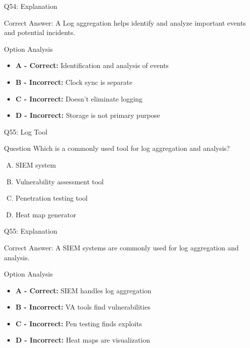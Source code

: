 \documentclass{beamer}
\begin{document}
	\begin{frame}{Q54: Explanation}
		\begin{block}{Correct Answer: A}
			Log aggregation helps identify and analyze important events and potential incidents.
		\end{block}
		\begin{block}{Option Analysis}
			\begin{itemize}
				\item \textbf{A - Correct:} Identification and analysis of events
				\item \textbf{B - Incorrect:} Clock sync is separate
				\item \textbf{C - Incorrect:} Doesn't eliminate logging
				\item \textbf{D - Incorrect:} Storage is not primary purpose
			\end{itemize}
		\end{block}
	\end{frame}
	
	\begin{frame}{Q55: Log Tool}
		\begin{block}{Question}
			Which is a commonly used tool for log aggregation and analysis?
		\end{block}
		\begin{enumerate}[(A)]
			\item SIEM system
			\item Vulnerability assessment tool
			\item Penetration testing tool
			\item Heat map generator
		\end{enumerate}
	\end{frame}
	
	\begin{frame}{Q55: Explanation}
		\begin{block}{Correct Answer: A}
			SIEM systems are commonly used for log aggregation and analysis.
		\end{block}
		\begin{block}{Option Analysis}
			\begin{itemize}
				\item \textbf{A - Correct:} SIEM handles log aggregation
				\item \textbf{B - Incorrect:} VA tools find vulnerabilities
				\item \textbf{C - Incorrect:} Pen testing finds exploits
				\item \textbf{D - Incorrect:} Heat maps are visualization
			\end{itemize}
		\end{block}
	\end{frame}
	
\end{document}
